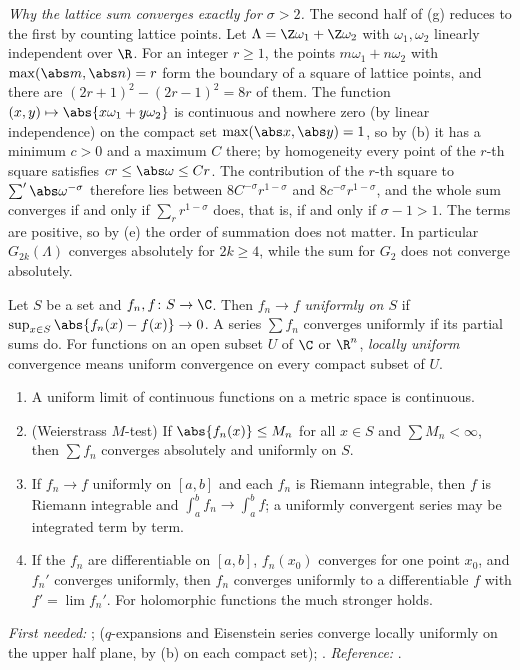 \emph{Why the lattice sum converges exactly for $\sigma>2$.} The second half of (g) reduces to the
first by counting lattice points. Let $\Lambda=\Z\omega_1+\Z\omega_2$ with $\omega_1,\omega_2$
linearly independent over $\R$. For an integer $r\ge1$, the points $m\omega_1+n\omega_2$ with
$\max(\abs m,\abs n)=r$ form the boundary of a square of lattice points, and there are
$(2r+1)^2-(2r-1)^2=8r$ of them. The function $(x,y)\mapsto\abs{x\omega_1+y\omega_2}$ is continuous
and nowhere zero (by linear independence) on the compact set $\max(\abs x,\abs y)=1$, so by
(b) it has a minimum $c>0$ and a maximum $C$ there; by homogeneity every
point of the $r$-th square satisfies $cr\le\abs\omega\le Cr$. The contribution of the $r$-th square
to $\sum'\abs\omega^{-\sigma}$ therefore lies between $8C^{-\sigma}r^{1-\sigma}$ and
$8c^{-\sigma}r^{1-\sigma}$, and the whole sum converges if and only if $\sum_rr^{1-\sigma}$ does,
that is, if and only if $\sigma-1>1$. The terms are positive, so by (e) the order of summation does
not matter. In particular $G_{2k}(\Lambda)$ converges absolutely for $2k\ge4$, while the sum for
$G_2$ does not converge absolutely.

\begin{definition}\label{def:prereq:uniform}
Let $S$ be a set and $f_n,f\colon S\to\C$. Then $f_n\to f$ \emph{uniformly on $S$} if
$\sup_{x\in S}\abs{f_n(x)-f(x)}\to0$. A series $\sum f_n$ converges uniformly if its partial sums do.
For functions on an open subset $U$ of $\C$ or $\R^n$, \emph{locally uniform} convergence means
uniform convergence on every compact subset of $U$.
\end{definition}

\begin{theorem}\label{thm:prereq:uniform}
\begin{enumerate}[label=(\alph*)]
\item A uniform limit of continuous functions on a metric space is continuous.
\item (Weierstrass $M$-test) If $\abs{f_n(x)}\le M_n$ for all $x\in S$ and $\sum M_n<\infty$, then
$\sum f_n$ converges absolutely and uniformly on $S$.
\item If $f_n\to f$ uniformly on $[a,b]$ and each $f_n$ is Riemann integrable, then $f$ is Riemann
integrable and $\int_a^bf_n\to\int_a^bf$; a uniformly convergent series may be integrated term by
term.
\item If the $f_n$ are differentiable on $[a,b]$, $f_n(x_0)$ converges for one point $x_0$, and
$f_n'$ converges uniformly, then $f_n$ converges uniformly to a differentiable $f$ with
$f'=\lim f_n'$. For holomorphic functions the much stronger  holds.
\end{enumerate}
\end{theorem}
\noindent\emph{First needed:} ;  ($q$-expansions and
Eisenstein series converge locally uniformly on the upper half plane, by (b) on each compact set);
. \emph{Reference:} \cite[Chapter 7, Theorems 7.10 and 7.12]{Rudin76}.

